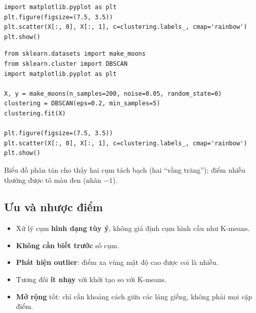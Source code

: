 \begin{vidu}[title={Bước 3: Trực quan hóa kết quả}]
\begin{lstlisting}
import matplotlib.pyplot as plt
plt.figure(figsize=(7.5, 3.5))
plt.scatter(X[:, 0], X[:, 1], c=clustering.labels_, cmap='rainbow')
plt.show()
\end{lstlisting}
\end{vidu}

\begin{vidu}[title={Ví dụ đầy đủ}]
\begin{lstlisting}
from sklearn.datasets import make_moons
from sklearn.cluster import DBSCAN
import matplotlib.pyplot as plt

X, y = make_moons(n_samples=200, noise=0.05, random_state=0)
clustering = DBSCAN(eps=0.2, min_samples=5)
clustering.fit(X)

plt.figure(figsize=(7.5, 3.5))
plt.scatter(X[:, 0], X[:, 1], c=clustering.labels_, cmap='rainbow')
plt.show()
\end{lstlisting}
\end{vidu}

\begin{ynghia}[title={Kết quả mong đợi}]
Biểu đồ phân tán cho thấy hai cụm tách bạch (hai ``vầng trăng''); điểm nhiễu thường được tô màu đen (nhãn $-1$).
\end{ynghia}


\subsection{Ưu và nhược điểm}

\begin{tinhchat}[title={Ưu điểm}]
\begin{itemize}
  \item Xử lý cụm \textbf{hình dạng tùy ý}, không giả định cụm hình cầu như K-means.
  \item \textbf{Không cần biết trước} số cụm.
  \item \textbf{Phát hiện outlier}: điểm xa vùng mật độ cao được coi là nhiễu.
  \item Tương đối \textbf{ít nhạy} với khởi tạo so với K-means.
  \item \textbf{Mở rộng} tốt: chỉ cần khoảng cách giữa các láng giềng, không phải mọi cặp điểm.
\end{itemize}
\end{tinhchat}

